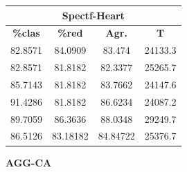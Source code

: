 \documentclass[11pt,a4paper]{article}
\theoremstyle{definition}
\begin{document}
\begin{tabbing}
{		\begin{tabular}{|c|c|c|c|}
			\hline
			\multicolumn{4}{|c|}{\textbf{Spectf-Heart}} \\ \hline
			\textbf{\%clas} & \textbf{\%red} & \textbf{Agr.} & \textbf{T} \\ \hline 
			82.8571 & 84.0909 & 83.474 & 24133.3\\ \hline
82.8571 & 81.8182 & 82.3377 & 25265.7\\ \hline
85.7143 & 81.8182 & 83.7662 & 24147.6\\ \hline
91.4286 & 81.8182 & 86.6234 & 24087.2\\ \hline
89.7059 & 86.3636 & 88.0348 & 29249.7\\ \hline
86.5126 & 83.18182 & 84.84722 & 25376.7\\ \hline
		\end{tabular}
		}
	\end{tabbing}
	
	\textbf{AGG-CA}
	
\end{document}

